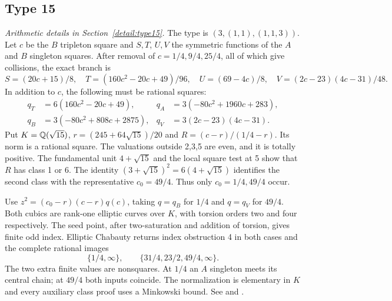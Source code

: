 \subsection{Type 15}\label{app:type15}
\noindent\emph{Arithmetic details in Section~\ref{detail:type15}.}\enspace
The type is $(3,(1,1),(1,1,3))$. Let $c$ be the $B$ tripleton
square and $S,T$, $U,V$ the symmetric functions of the $A$ and
$B$ singleton squares. After removal of $c=1/4,9/4,25/4$, all
of which give collisions, the exact branch is
\[
 S=(20c+15)/8,\quad T=(160c^2-20c+49)/96,
 \quad U=(69-4c)/8,\quad V=(2c-23)(4c-31)/48.
\]
In addition to $c$, the following must be rational squares:
\[
\begin{aligned}
 q_T&=6(160c^2-20c+49),&q_A&=3(-80c^2+1960c+283),\\
 q_B&=3(-80c^2+808c+2875),&q_V&=3(2c-23)(4c-31).
\end{aligned}
\]
Put $K=\mathbb Q(\sqrt{15})$, $r=(245+64\sqrt{15})/20$ and
$R=(c-r)/(1/4-r)$. Its norm is a rational square. The valuations
outside 2,3,5 are even, and it is totally positive. The fundamental
unit $4+\sqrt{15}$ and the local square test at 5 show that $R$
has class 1 or 6. The identity
$(3+\sqrt{15})^2=6(4+\sqrt{15})$ identifies the second class with
the representative $c_0=49/4$. Thus only $c_0=1/4,49/4$ occur.

Use $z^2=(c_0-r)(c-r)q(c)$, taking $q=q_B$ for $1/4$ and
$q=q_V$ for $49/4$. Both cubics are rank-one elliptic curves over
$K$, with torsion orders two and four respectively. The seed point,
after two-saturation and addition of torsion, gives finite odd index.
Elliptic Chabauty returns index obstruction 4 in both cases and the
complete rational images
\[
 \{1/4,\infty\},\qquad\{31/4,23/2,49/4,\infty\}.
\]
The two extra finite values are nonsquares. At $1/4$ an $A$
singleton meets its central chain; at $49/4$ both inputs coincide.
The normalization is elementary in $K$ and every auxiliary class
proof uses a Minkowski bound. See
 and
.

